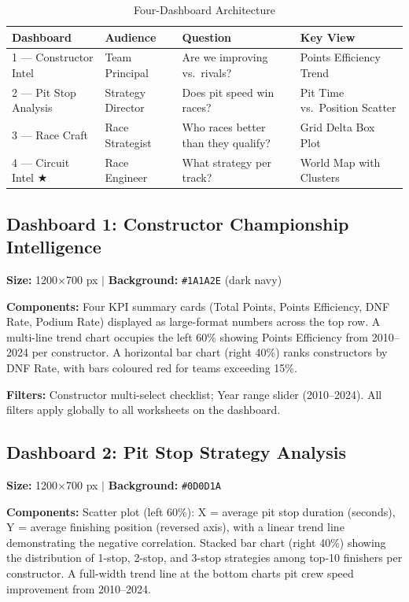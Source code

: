 \documentclass[12pt, a4paper]{article}
\begin{document}
\begin{table}[H]
\centering
\caption{Four-Dashboard Architecture}
\begin{tabularx}{\textwidth}{l l l X}
\toprule
\textbf{Dashboard} & \textbf{Audience} & \textbf{Question} & \textbf{Key View} \\
\midrule
1 --- Constructor Intel  & Team Principal    & Are we improving vs.\ rivals?           & Points Efficiency Trend \\
2 --- Pit Stop Analysis  & Strategy Director & Does pit speed win races?               & Pit Time vs.\ Position Scatter \\
3 --- Race Craft         & Race Strategist   & Who races better than they qualify?      & Grid Delta Box Plot \\
4 --- Circuit Intel $\bigstar$ & Race Engineer & What strategy per track? & World Map with Clusters \\
\bottomrule
\end{tabularx}
\end{table}

\subsection{Dashboard 1: Constructor Championship Intelligence}
\textbf{Size:} 1200$\times$700 px $|$ \textbf{Background:} \texttt{\#1A1A2E} (dark navy)

\textbf{Components:} Four KPI summary cards (Total Points, Points Efficiency, DNF Rate, Podium Rate) displayed as large-format numbers across the top row. A multi-line trend chart occupies the left 60\% showing Points Efficiency from 2010--2024 per constructor. A horizontal bar chart (right 40\%) ranks constructors by DNF Rate, with bars coloured red for teams exceeding 15\%.

\textbf{Filters:} Constructor multi-select checklist; Year range slider (2010--2024). All filters apply globally to all worksheets on the dashboard.

\subsection{Dashboard 2: Pit Stop Strategy Analysis}
\textbf{Size:} 1200$\times$700 px $|$ \textbf{Background:} \texttt{\#0D0D1A}

\textbf{Components:} Scatter plot (left 60\%): X = average pit stop duration (seconds), Y = average finishing position (reversed axis), with a linear trend line demonstrating the negative correlation. Stacked bar chart (right 40\%) showing the distribution of 1-stop, 2-stop, and 3-stop strategies among top-10 finishers per constructor. A full-width trend line at the bottom charts pit crew speed improvement from 2010--2024.
\end{document}
